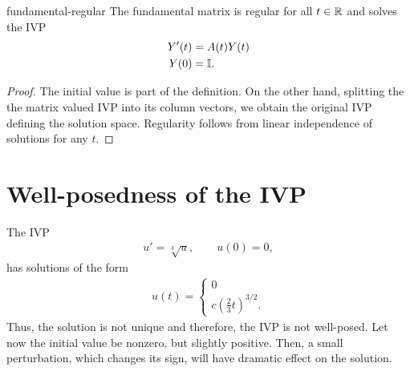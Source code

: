 


\begin{Corollary}{fundamental-regular}
  The fundamental matrix is regular for all $t\in \mathbb R$ and solves the
  IVP
  \begin{align*}
    Y'(t) &= A(t)Y(t)\\
    Y (0) &= \mathbb I.
  \end{align*}
\end{Corollary}

\begin{proof}
  The initial value is part of the definition. On the other hand,
  splitting the the matrix valued IVP into its column vectors, we
  obtain the original IVP defining the solution space. Regularity
  follows from linear independence of solutions for any $t$.
\end{proof}

\section{Well-posedness of the IVP}
\label{sec:awa:well-posedness}




\begin{example}
  The IVP
  \begin{gather*}
    u'= \sqrt[3]{u}, \qquad u(0) = 0,
  \end{gather*}
  has solutions of the form
  \begin{gather*}
    u(t) =
    \begin{cases}
      0 \\
      c \left(\tfrac23t\right)^{3/2}.
    \end{cases}
  \end{gather*}
  Thus, the solution is not unique and therefore, the IVP is not
  well-posed.
  Let now the initial value be nonzero, but slightly positive. Then, a small
  perturbation, which changes its sign, will have dramatic effect on
  the solution.
\end{example}

